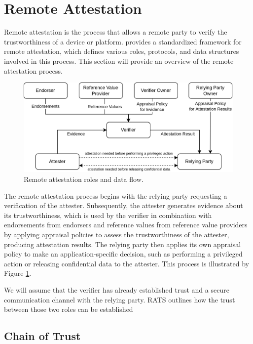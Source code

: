 \section{Remote Attestation}
\label{sec:remote-attestation}

Remote attestation is the process that allows a remote party to verify the
trustworthiness of a device or platform.  \cite{rfc9334}
provides a standardized framework for remote attestation, which defines various
roles, protocols, and data structures involved in this process. This section
will provide an overview of the remote attestation process.

\begin{figure}[H]
  \centering
  \includegraphics[width=0.8\linewidth]{resources/rats-data-flow.drawio.png}
  \caption{Remote attestation roles and data flow.}
  \label{fig:rats-data-flow}
\end{figure}


The remote attestation process begins with the relying party requesting a
verification of the attester. Subsequently, the attester generates evidence
about its trustworthiness, which is used by the verifier in combination with
endorsements from endorsers and reference values from reference value providers
by applying appraisal policies to assess the trustworthiness of the attester,
producing attestation results. The relying party then applies its own appraisal
policy to make an application-specific decision, such as performing a privileged
action or releasing confidential data to the attester. This process is
illustrated by Figure \ref{fig:rats-data-flow}.

We will assume that the verifier has already established trust and a secure
communication channel with the relying party. RATS outlines how the trust
between those two roles can be established \cite[Section~7.1]{rfc9334}

\subsection{Chain of Trust}
\label{sec:ra-chain-of-trust}

